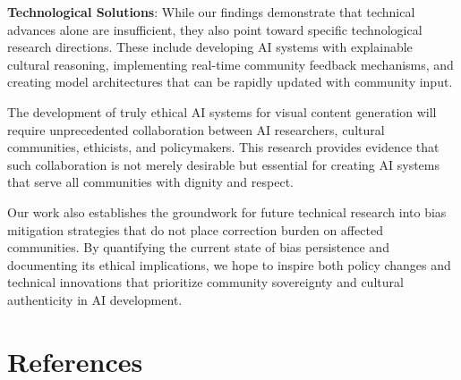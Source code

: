 \documentclass{article}
\begin{document}
\textbf{Technological Solutions}: While our findings demonstrate that technical advances alone are insufficient, they also point toward specific technological research directions. These include developing AI systems with explainable cultural reasoning, implementing real-time community feedback mechanisms, and creating model architectures that can be rapidly updated with community input.

The development of truly ethical AI systems for visual content generation will require unprecedented collaboration between AI researchers, cultural communities, ethicists, and policymakers. This research provides evidence that such collaboration is not merely desirable but essential for creating AI systems that serve all communities with dignity and respect.

Our work also establishes the groundwork for future technical research into bias mitigation strategies that do not place correction burden on affected communities. By quantifying the current state of bias persistence and documenting its ethical implications, we hope to inspire both policy changes and technical innovations that prioritize community sovereignty and cultural authenticity in AI development.

\section*{References}
\end{document}
